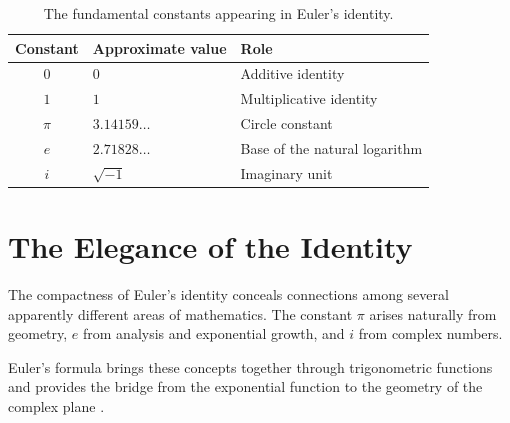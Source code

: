 \documentclass[a4paper,11pt]{article}
\begin{document}
\begin{table}[htbp]

    \centering

    \caption{The fundamental constants appearing in Euler's identity.}

    \label{tab:constants}

    \begin{tabular}{cll}

        \toprule

        \textbf{Constant}
        & \textbf{Approximate value}
        & \textbf{Role} \\

        \midrule

        $0$
        & $0$
        & Additive identity \\

        $1$
        & $1$
        & Multiplicative identity \\

        $\pi$
        & $3.14159\ldots$
        & Circle constant \\

        $e$
        & $2.71828\ldots$
        & Base of the natural logarithm \\

        $i$
        & $\sqrt{-1}$
        & Imaginary unit \\

        \bottomrule

    \end{tabular}

\end{table}



\section{The Elegance of the Identity}

The compactness of Euler's identity conceals connections among several
apparently different areas of mathematics. The constant $\pi$ arises
naturally from geometry, $e$ from analysis and exponential growth,
and $i$ from complex numbers.

Euler's formula brings these concepts together through trigonometric
functions and provides the bridge from the exponential function to
the geometry of the complex plane \cite{nahin2006euler}.
\end{document}
